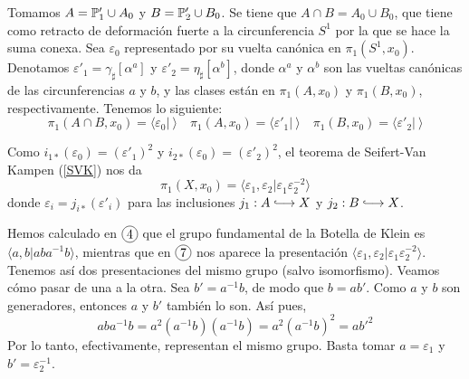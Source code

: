 \documentclass[GTS.tex]{subfiles}
\begin{document}
\begin{ej}
\begin{itemize}

Tomamos $A=\mathbb{P}'_1\cup A_0$ y $B=\mathbb{P}_2'\cup B_0$. Se tiene que $A\cap B=A_0\cup B_0$, que tiene como retracto de deformación fuerte a la circunferencia $S^1$ por la que se hace la suma conexa. Sea $\varepsilon_0$ representado por su vuelta canónica en $\pi_1(S^1,x_0)$. Denotamos $\varepsilon'_1=\gamma_\sharp[\alpha^a]$ y $\varepsilon'_2=\eta_\sharp[\alpha^b]$, donde $\alpha^a$ y $\alpha^b$ son las vueltas canónicas de las circunferencias $a$ y $b$, y las clases están en $\pi_1(A,x_0)$ y $\pi_1(B,x_0)$, respectivamente. Tenemos lo siguiente:
\[
\pi_1(A\cap B,x_0)=\langle\varepsilon_0|\ \rangle\quad\pi_1(A,x_0)=\langle\varepsilon'_1|\ \rangle\quad\pi_1(B,x_0)=\langle\varepsilon'_2|\ \rangle
\]

Como $i_{1*}(\varepsilon_0)=(\varepsilon'_1)^2$ y $i_{2*}(\varepsilon_0)=(\varepsilon'_2)^2$, el teorema de Seifert-Van Kampen (\ref{SVK}) nos da
\[
\pi_1(X,x_0)=\langle\varepsilon_1,\varepsilon_2|\varepsilon_1^{}\varepsilon_2^{-2}\rangle
\]
donde $\varepsilon_i=j_{i*}(\varepsilon'_i)$ para las inclusiones $j_1:A\longhookarrow X$ y $j_2:B\longhookarrow X$.



\begin{nota}
Hemos calculado en $\circled{4}$ que el grupo fundamental de la Botella de Klein es $\langle a,b| aba^{-1}b\rangle$, mientras que en $\circled{7}$ nos aparece la presentación $\langle\varepsilon_1,\varepsilon_2|\varepsilon_1^{}\varepsilon_2^{-2}\rangle$. Tenemos así dos presentaciones del mismo grupo (salvo isomorfismo). Veamos cómo pasar de una a la otra. Sea $b'=a^{-1}b$, de modo que $b=ab'$. Como $a$ y $b$ son generadores, entonces $a$ y $b'$ también lo son. Así pues,
\[
aba^{-1}b=a^2(a^{-1}b)(a^{-1}b)=a^2(a^{-1}b)^2=ab'^2
\]
Por lo tanto, efectivamente, representan el mismo grupo. Basta tomar $a=\varepsilon_1$ y $b'=\varepsilon_2^{-1}$.
\end{nota}
\end{itemize}

\end{ej}
\end{document}
